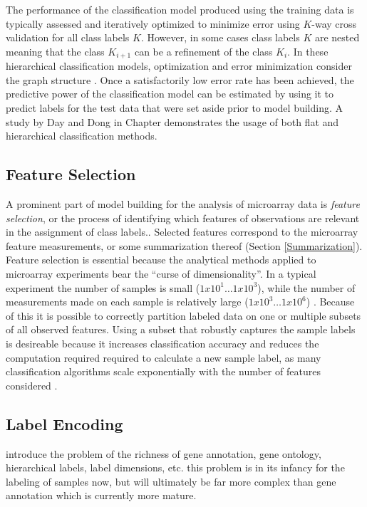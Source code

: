 The performance of the classification model produced using the training data is
typically assessed and iteratively optimized to minimize error using $K$-way
cross validation for all class labels $K$.  However, in some cases class labels
$K$ are nested meaning that the class $K_{i+1}$ can be a refinement of the
class $K_{i}$.  In these hierarchical classification models, optimization and
error minimization consider the graph structure \cite{pachinko}.  Once a
satisfactorily low error rate has been achieved, the predictive power of the
classification model can be estimated by using it to predict labels for the
test data that were set aside prior to model building.  A study by Day and Dong
in Chapter \classchapter demonstrates the usage of both flat and hierarchical
classification methods.

\subsection{Feature Selection}
\label{Feature Selection}

A prominent part of model building for the analysis of microarray data is
\emph{feature selection}, or the process of identifying which features of
observations are relevant in the assignment of class labels..  Selected
features correspond to the microarray feature measurements, or some
summarization thereof (Section \ref{Summarization}).  Feature selection is
essential because the analytical methods applied to microarray experiments bear
the ``curse of dimensionality''.  In a typical experiment the number of samples
is small ($1x10^1 \dots 1x10^3$), while the number of measurements made on each
sample is relatively large ($1x10^3 \dots 1x10^6$) \cite{Bellman_1957}.
Because of this it is possible to correctly partition labeled data on one or
multiple subsets of all observed features.  Using a subset that robustly
captures the sample labels is desireable because it increases classification
accuracy and reduces the computation required required to calculate a new
sample label, as many classification algorithms scale exponentially with the
number of features considered \cite{john94irrelevant}.

\subsection{Label Encoding}
\label{Label Encoding}

introduce the problem of the richness of gene annotation, gene ontology,
hierarchical labels, label dimensions, etc.  this problem is in its infancy for
the labeling of samples now, but will ultimately be far more complex than gene
annotation which is currently more mature.
